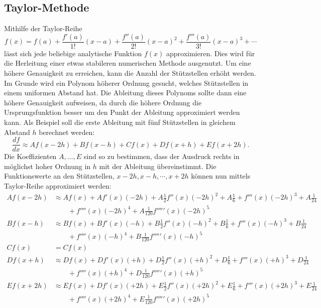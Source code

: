 \subsection{Taylor-Methode}
%
Mithilfe der Taylor-Reihe 
\begin{equation}
f(x) = f(a)+{\frac {f'(a)}{1!}}(x-a)+{\frac {f''(a)}{2!}}(x-a)^{2}+{\frac {f'''(a)}{3!}}(x-a)^{3}+\cdots
\label{ableitung:eqn:taylorseries}
\end{equation}
lässt sich jede beliebige analytische Funktion $f(x)$ approximieren.
Dies wird für die Herleitung einer etwas stabileren numerischen Methode
ausgenutzt.
Um eine höhere Genauigkeit zu erreichen, kann die Anzahl der Stützstellen erhöht werden.
Im Grunde wird ein Polynom höherer Ordnung gesucht, welches Stützstellen in einem uniformen Abstand hat.
Die Ableitung dieses Polynoms sollte dann eine höhere Genauigkeit
aufweisen, da durch die höhere Ordnung die Ursprungsfunktion besser
um den Punkt der Ableitung approximiert werden kann.
Als Beispiel soll die erste Ableitung mit fünf Stützstellen in
gleichem Abstand $h$ berechnet werden:
\begin{equation}
\frac{df}{dx}
\approx
Af(x-2h) + Bf(x-h) + Cf(x) + Df(x+h) + Ef(x+2h) \text{.}
\label{ableitung:eqn:taylor-support}
\end{equation}
Die Koeffizienten $A, \dots, E$ sind so zu bestimmen, dass der
Ausdruck rechts in möglichst hoher Ordnung in $h$ mit der Ableitung
übereinstimmt.
Die Funktionswerte an den Stützstellen, $x-2h, x-h, \cdots, x+2h$ können nun mittels Taylor-Reihe approximiert werden:
\begin{equation*}
\begin{aligned}
Af(x-2h)
&\approx
Af(x) + Af'(x)(-2h) + A\frac{1}{2}f''(x)(-2h)^2+A\frac{1}{6} + f'''(x)(-2h)^3+A\frac{1}{24}
\\
&\qquad+
f''''(x)(-2h)^4 + A\frac{1}{120}f'''''(x)(-2h)^5
\\
Bf(x-h)
&\approx
Bf(x) + Bf'(x)(-h) + B\frac{1}{2}f''(x)(-h)^2+B\frac{1}{6} + f'''(x)(-h)^3+B\frac{1}{24}
\\ 
&\qquad+
f''''(x)(-h)^4 + B\frac{1}{120}f'''''(x)(-h)^5
\\
Cf(x)
&=
Cf(x)
\\
Df(x+h)
&\approx
Df(x) + Df'(x)(+h) + D\frac{1}{2}f''(x)(+h)^2+D\frac{1}{6} + f'''(x)(+h)^3+D\frac{1}{24}
\\ 
&\qquad+
f''''(x)(+h)^4 + D\frac{1}{120}f'''''(x)(+h)^5
\\
Ef(x+2h)
&\approx
Ef(x) + Df'(x)(+2h) + E\frac{1}{2}f''(x)(+2h)^2+E\frac{1}{6} + f'''(x)(+2h)^3+E\frac{1}{24}
\\ 
&\qquad+
f''''(x)(+2h)^4 + E\frac{1}{120}f'''''(x)(+2h)^5
\end{aligned}
\end{equation*}
